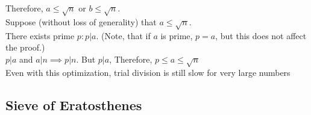 \documentclass[12pt]{article}
\begin{document}
    Therefore, $a \leq \sqrt{n}$ or $b \leq \sqrt{n}$. \\
    Suppose (without loss of generality) that $a \leq \sqrt{n}$.\\
    There exists prime $p: p|a$. (Note, that if $a$ is prime, $p = a$, but this
    does not affect the proof.)\\
    $p|a$ and $a|n \implies p|n$. But $p|a$, Therefore,  $p \leq a \leq \sqrt{n}$\\
    
    Even with this optimization, trial division is still slow for very large
    numbers 

    \subsection{Sieve of Eratosthenes}
\end{document}
